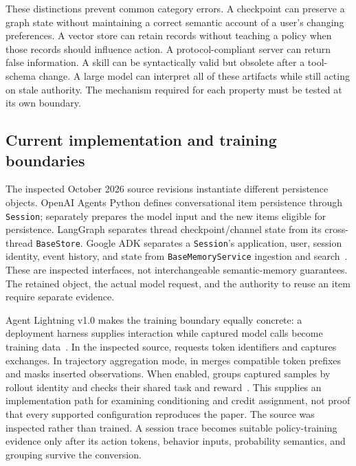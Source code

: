 These distinctions prevent common category errors. A checkpoint can preserve a graph state without maintaining a correct semantic account of a user's changing preferences. A vector store can retain records without teaching a policy when those records should influence action. A protocol-compliant server can return false information. A skill can be syntactically valid but obsolete after a tool-schema change. A large model can interpret all of these artifacts while still acting on stale authority. The mechanism required for each property must be tested at its own boundary.

\subsection{Current implementation and training boundaries}\label{sec:C01:implementations}
The inspected October 2026 source revisions instantiate different persistence objects. OpenAI Agents Python defines conversational item persistence through \texttt{Session};  separately prepares the model input and the new items eligible for persistence. LangGraph separates thread checkpoint/channel state from its cross-thread \texttt{BaseStore}. Google ADK separates a \texttt{Session}'s application, user, session identity, event history, and state from \texttt{BaseMemoryService} ingestion and search~\cite{ch01_openai_sdk_20261029,ch01_langgraph_20261029,ch01_adk_20261029}. These are inspected interfaces, not interchangeable semantic-memory guarantees. The retained object, the actual model request, and the authority to reuse an item require separate evidence.

Agent Lightning v1.0 makes the training boundary equally concrete: a deployment harness supplies interaction while captured model calls become training data~\cite{ch01_lightning2026}. In the inspected source,  requests token identifiers and  captures exchanges. In trajectory aggregation mode,  in  merges compatible token prefixes and masks inserted observations. When enabled,  groups captured samples by rollout identity and checks their shared task and reward~\cite{ch01_lightning_code2026}. This supplies an implementation path for examining conditioning and credit assignment, not proof that every supported configuration reproduces the paper. The source was inspected rather than trained. A session trace becomes suitable policy-training evidence only after its action tokens, behavior inputs, probability semantics, and grouping survive the conversion.

